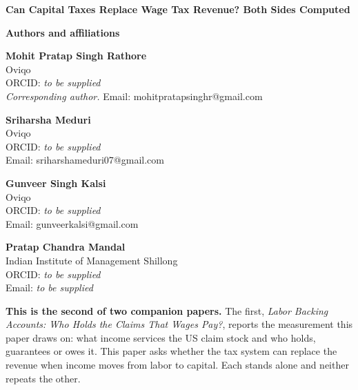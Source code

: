 \documentclass[11pt]{article}
\newif\ifthreeauth
\begin{document}
\begin{center}
{\LARGE\bfseries Can Capital Taxes Replace Wage Tax Revenue? Both Sides Computed}
\end{center}

\vspace{1.5em}

\noindent\textbf{Authors and affiliations}

\vspace{0.5em}

\noindent
\textbf{Mohit Pratap Singh Rathore}\\
Oviqo\\
ORCID: \textit{to be supplied}\\
\textit{Corresponding author.} Email: mohitpratapsinghr@gmail.com

\vspace{0.8em}

\noindent
\textbf{Sriharsha Meduri}\\
Oviqo\\
ORCID: \textit{to be supplied}\\
Email: sriharshameduri07@gmail.com

\vspace{0.8em}

\noindent
\textbf{Gunveer Singh Kalsi}\\
Oviqo\\
ORCID: \textit{to be supplied}\\
Email: gunveerkalsi@gmail.com

\ifthreeauth\else
\vspace{0.8em}

\noindent
\textbf{Pratap Chandra Mandal}\\
Indian Institute of Management Shillong\\
ORCID: \textit{to be supplied}\\
Email: \textit{to be supplied}
\fi

\vspace{1em}

\noindent\textbf{This is the second of two companion papers.} The first, \textit{Labor Backing
Accounts: Who Holds the Claims That Wages Pay?}, reports the measurement this paper draws on:
what income services the US claim stock and who holds, guarantees or owes it. This paper asks
whether the tax system can replace the revenue when income moves from labor to capital. Each
stands alone and neither repeats the other.

\vspace{0.5em}
\end{document}
